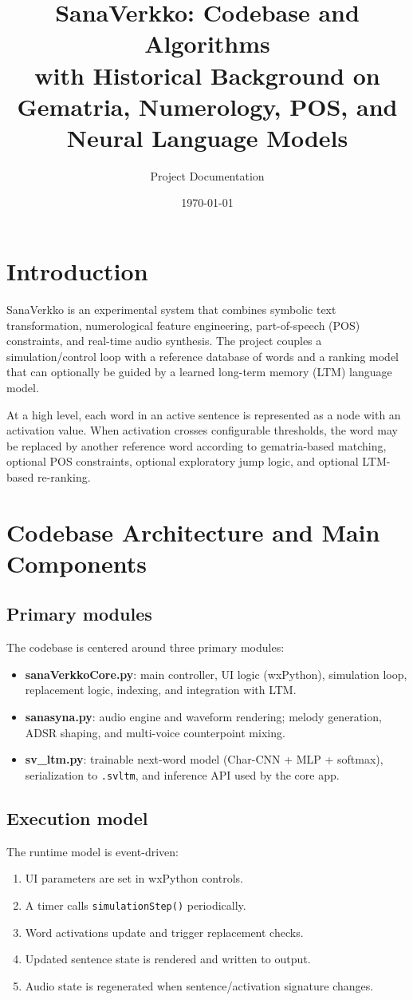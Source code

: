 \documentclass[11pt,a4paper]{report}
\title{SanaVerkko: Codebase and Algorithms\\\large with Historical Background on Gematria, Numerology, POS, and Neural Language Models}
\author{Project Documentation}
\date{\today}
\begin{document}
\maketitle
\tableofcontents

\chapter{Introduction}
SanaVerkko is an experimental system that combines symbolic text transformation, numerological feature engineering, part-of-speech (POS) constraints, and real-time audio synthesis. The project couples a simulation/control loop with a reference database of words and a ranking model that can optionally be guided by a learned long-term memory (LTM) language model.

At a high level, each word in an active sentence is represented as a node with an activation value. When activation crosses configurable thresholds, the word may be replaced by another reference word according to gematria-based matching, optional POS constraints, optional exploratory jump logic, and optional LTM-based re-ranking.

\chapter{Codebase Architecture and Main Components}
\section{Primary modules}
The codebase is centered around three primary modules:
\begin{itemize}
  \item \textbf{sanaVerkkoCore.py}: main controller, UI logic (wxPython), simulation loop, replacement logic, indexing, and integration with LTM.
  \item \textbf{sanasyna.py}: audio engine and waveform rendering; melody generation, ADSR shaping, and multi-voice counterpoint mixing.
  \item \textbf{sv\_ltm.py}: trainable next-word model (Char-CNN + MLP + softmax), serialization to \texttt{.svltm}, and inference API used by the core app.
\end{itemize}

\section{Execution model}
The runtime model is event-driven:
\begin{enumerate}
  \item UI parameters are set in wxPython controls.
  \item A timer calls \texttt{simulationStep()} periodically.
  \item Word activations update and trigger replacement checks.
  \item Updated sentence state is rendered and written to output.
  \item Audio state is regenerated when sentence/activation signature changes.
\end{enumerate}
\end{document}
